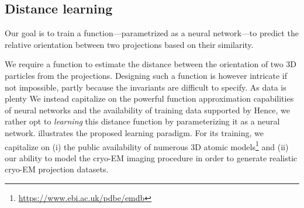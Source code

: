 
\subsection{Distance learning}\label{sec:method:distance-learning}


Our goal is to train a function---parametrized as a neural network---to predict the relative orientation between two projections based on their similarity.

We require a function to estimate the distance between the orientation of two 3D particles from the projections.
Designing such a function is however intricate if not impossible, partly because the invariants are difficult to specify.
As data is plenty
We instead capitalize on the powerful function approximation capabilities of neural networks and the availability of training data
supported by
Hence, we rather opt to \textit{learning} this distance function by parameterizing it as a neural network.
 illustrates the proposed learning paradigm.
For its training, we capitalize on (i) the public availability of numerous 3D atomic models\footnote{\url{https://www.ebi.ac.uk/pdbe/emdb}} and (ii) our ability to model the cryo-EM imaging procedure in order to generate realistic cryo-EM projection datasets.

